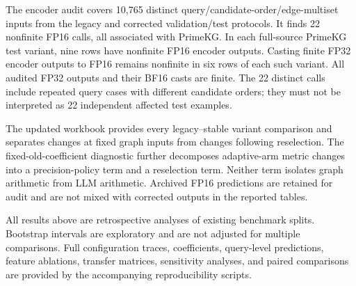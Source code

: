 The encoder audit covers 10,765 distinct query/candidate-order/edge-multiset
inputs from the legacy and corrected validation/test protocols. It finds 22
nonfinite FP16 calls, all associated with PrimeKG. In each full-source PrimeKG
test variant, nine rows have nonfinite FP16 encoder outputs. Casting finite
FP32 encoder outputs to FP16 remains nonfinite in six rows of each such
variant. All audited FP32 outputs and their BF16 casts are finite. The 22
distinct calls include repeated query cases with different candidate orders;
they must not be interpreted as 22 independent affected test examples.

The updated workbook provides every legacy--stable variant comparison and
separates changes at fixed graph inputs from changes following reselection.
The fixed-old-coefficient diagnostic further decomposes adaptive-arm metric
changes into a precision-policy term and a reselection term. Neither term
isolates graph arithmetic from LLM arithmetic. Archived FP16 predictions are
retained for audit and are not mixed with corrected outputs in the reported
tables.

All results above are retrospective analyses of existing benchmark splits.
Bootstrap intervals are exploratory and are not adjusted for multiple
comparisons. Full configuration traces, coefficients, query-level predictions,
feature ablations, transfer matrices, sensitivity analyses, and paired
comparisons are provided by the accompanying reproducibility scripts.
